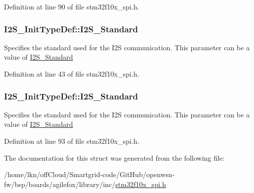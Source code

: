 Definition at line 90 of file stm32f10x\+\_\+spi.\+h.

\subsubsection[{\texorpdfstring{I2\+S\+\_\+\+Standard}{I2S_Standard}}]{ I2\+S\+\_\+\+Init\+Type\+Def\+::\+I2\+S\+\_\+\+Standard}\hypertarget{struct_i2_s___init_type_def_a21c487143d1264cd51ca566bc63fcb55}{}\label{struct_i2_s___init_type_def_a21c487143d1264cd51ca566bc63fcb55}
Specifies the standard used for the I2S communication. This parameter can be a value of \hyperlink{group___i2_s___standard}{I2\+S\+\_\+\+Standard} 

Definition at line 43 of file stm32f10x\+\_\+spi.\+h.

\subsubsection[{\texorpdfstring{I2\+S\+\_\+\+Standard}{I2S_Standard}}]{ I2\+S\+\_\+\+Init\+Type\+Def\+::\+I2\+S\+\_\+\+Standard}\hypertarget{struct_i2_s___init_type_def_ae987936e7cb9a962ee388c98f8c872b7}{}\label{struct_i2_s___init_type_def_ae987936e7cb9a962ee388c98f8c872b7}
Specifies the standard used for the I2S communication. This parameter can be a value of \hyperlink{group___i2_s___standard}{I2\+S\+\_\+\+Standard} 

Definition at line 93 of file stm32f10x\+\_\+spi.\+h.



The documentation for this struct was generated from the following file\+:\begin{DoxyCompactItemize}
\item 
/home/lkn/off\+Cloud/\+Smartgrid-\/code/\+Git\+Hub/openwsn-\/fw/bsp/boards/agilefox/library/inc/\hyperlink{agilefox_2library_2inc_2stm32f10x__spi_8h}{stm32f10x\+\_\+spi.\+h}\end{DoxyCompactItemize}
